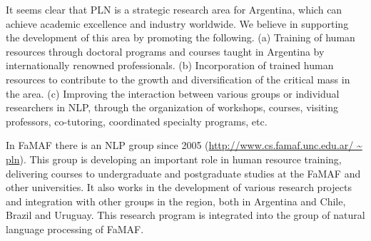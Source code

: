 % 
% 
% 

It seems clear that PLN is a strategic research area for Argentina, which can
achieve academic excellence and industry worldwide. We believe in supporting the
development of this area by promoting the following. (a) Training of human
resources through doctoral programs and courses taught in Argentina by
internationally renowned professionals. (b) Incorporation of trained human
resources to contribute to the growth and diversification of the critical mass
in the area. (c) Improving the interaction between various groups or
individual researchers in NLP, through the organization of workshops, courses,
visiting professors, co-tutoring, coordinated specialty programs, etc.



In FaMAF there is an NLP group since 2005 (\url{http://www.cs.famaf.unc.edu.ar/
~ pln}). This group is developing an important role in human resource training,
delivering courses to undergraduate and postgraduate studies at the FaMAF and
other universities. It also works in the development of various research
projects and integration with other groups in the region, both in Argentina and
Chile, Brazil and Uruguay. This research program is integrated into the group of
natural language processing of FaMAF. 


